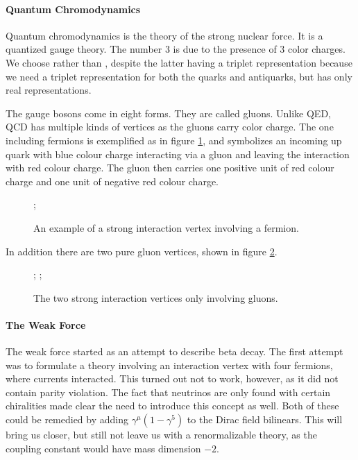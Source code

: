 \paragraph{Quantum Chromodynamics}
Quantum chromodynamics is the theory of the strong nuclear force. It is a quantized  gauge theory. The number 3 is due to the presence of 3 color charges. We choose  rather than , despite the latter having a triplet representation because we need a triplet representation for both the quarks and antiquarks, but  has only real representations.

The gauge bosons come in eight forms. They are called gluons. Unlike QED, QCD has multiple kinds of vertices as the gluons carry color charge. The one including fermions is exemplified as in figure \ref{fig:strong_vert_fer_ex}, and symbolizes an incoming up quark with blue colour charge interacting via a gluon and leaving the interaction with red colour charge. The gluon then carries one positive unit of red colour charge and one unit of negative red colour charge.

\begin{figure}[!ht]
	\centering
	;
	\caption{An example of a strong interaction vertex involving a fermion.}
	\label{fig:strong_vert_fer_ex}
\end{figure}

In addition there are two pure gluon vertices, shown in figure \ref{fig:strong_vert_glu}.

\begin{figure}[!ht]
	\centering
	;
	;
	\caption{The two strong interaction vertices only involving gluons.}
	\label{fig:strong_vert_glu}
\end{figure}

\paragraph{The Weak Force}
The weak force started as an attempt to describe beta decay. The first attempt was to formulate a theory involving an interaction vertex with four fermions, where currents interacted. This turned out not to work, however, as it did not contain parity violation. The fact that neutrinos are only found with certain chiralities made clear the need to introduce this concept as well. Both of these could be remedied by adding $\gamma^{\mu}(1 - \gamma^{5})$ to the Dirac field bilinears. This will bring us closer, but still not leave us with a renormalizable theory, as the coupling constant would have mass dimension $-2$.


